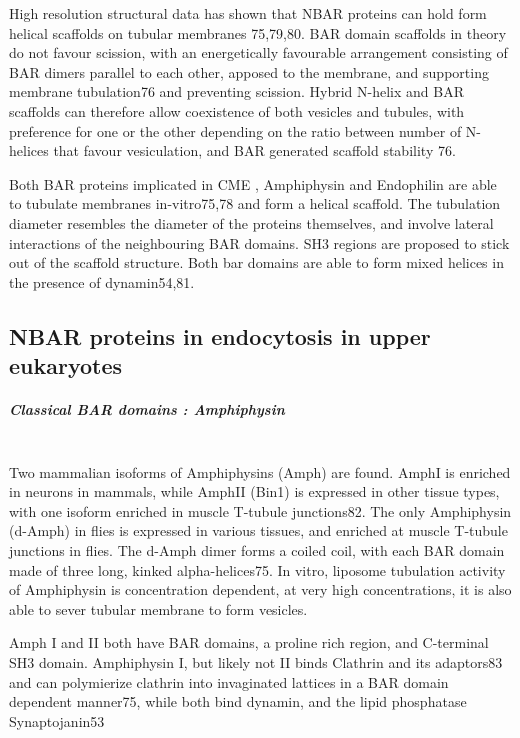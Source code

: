 	\vspace{5mm}
	High resolution structural data has shown that NBAR proteins can hold form helical scaffolds on tubular membranes 75,79,80. BAR domain scaffolds in theory do not favour scission, with an energetically favourable arrangement consisting of BAR dimers parallel to each other, apposed to the membrane, and supporting membrane tubulation76 and preventing scission. Hybrid N-helix and BAR scaffolds can therefore allow coexistence of both vesicles and tubules, with preference for one or the other depending on the ratio between number of N-helices that favour vesiculation, and BAR generated scaffold stability 76. 

	\vspace{5mm}
	Both BAR proteins implicated in CME , Amphiphysin and Endophilin are able to tubulate membranes in-vitro75,78 and form a helical scaffold. The tubulation diameter resembles the diameter of the proteins themselves, and involve lateral interactions of the neighbouring BAR domains. SH3 regions are proposed to stick out of the scaffold structure. Both bar domains are able to form mixed helices in the presence of dynamin54,81. 

	\subsection{NBAR proteins in endocytosis in upper eukaryotes}		
		\subparagraph{Classical BAR domains : Amphiphysin}
		\mbox{} \\
		Two mammalian isoforms of Amphiphysins (Amph) are found. AmphI is enriched in neurons in mammals, while AmphII (Bin1) is expressed in other tissue types, with one isoform enriched in muscle T-tubule junctions82. The only Amphiphysin (d-Amph) in flies is expressed in various tissues, and enriched at muscle T-tubule junctions in flies. The d-Amph dimer forms a coiled coil, with each BAR domain made of three long, kinked alpha-helices75. In vitro, liposome tubulation activity of Amphiphysin is concentration dependent, at very high concentrations, it is also able to sever tubular membrane to form vesicles. 

		\vspace{5mm}
		Amph I and II both have BAR domains, a proline rich region, and C-terminal SH3 domain. Amphiphysin I, but likely not II binds Clathrin and its adaptors83 and can polymierize clathrin into invaginated lattices in a BAR domain dependent manner75, while both bind dynamin, and the lipid phosphatase Synaptojanin53



